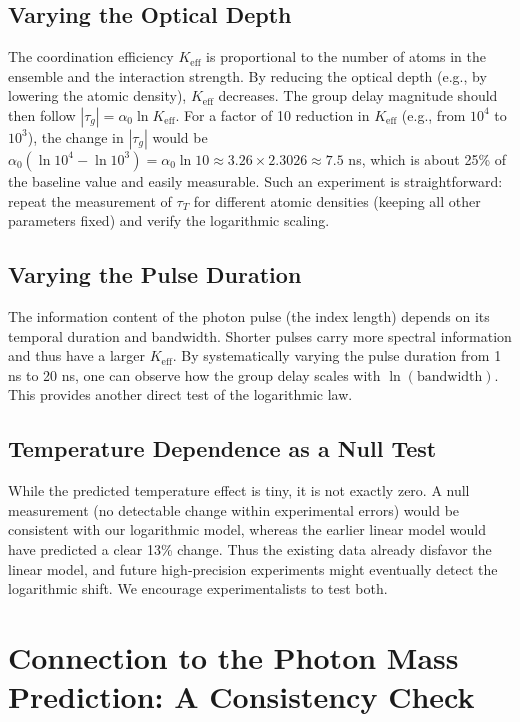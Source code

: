 \documentclass[12pt,a4paper]{article}
\newcommand{\Keff}{K_{\mathrm{eff}}}
\begin{document}
	\subsection{Varying the Optical Depth}
	
	The coordination efficiency \(\Keff\) is proportional to the number of atoms in the ensemble and the interaction strength. By reducing the optical depth (e.g., by lowering the atomic density), \(\Keff\) decreases. The group delay magnitude should then follow \(|\tau_g| = \alpha_0 \ln\Keff\). For a factor of 10 reduction in \(\Keff\) (e.g., from \(10^4\) to \(10^3\)), the change in \(|\tau_g|\) would be \(\alpha_0 (\ln 10^4 - \ln 10^3) = \alpha_0 \ln 10 \approx 3.26 \times 2.3026 \approx 7.5\) ns, which is about 25\% of the baseline value and easily measurable. Such an experiment is straightforward: repeat the measurement of \(\tau_T\) for different atomic densities (keeping all other parameters fixed) and verify the logarithmic scaling.
	
	\subsection{Varying the Pulse Duration}
	
	The information content of the photon pulse (the index length) depends on its temporal duration and bandwidth. Shorter pulses carry more spectral information and thus have a larger \(\Keff\). By systematically varying the pulse duration from 1 ns to 20 ns, one can observe how the group delay scales with \(\ln(\text{bandwidth})\). This provides another direct test of the logarithmic law.
	
	\subsection{Temperature Dependence as a Null Test}
	
	While the predicted temperature effect is tiny, it is not exactly zero. A null measurement (no detectable change within experimental errors) would be consistent with our logarithmic model, whereas the earlier linear model would have predicted a clear 13\% change. Thus the existing data already disfavor the linear model, and future high‑precision experiments might eventually detect the logarithmic shift. We encourage experimentalists to test both.
	

\section{Connection to the Photon Mass Prediction: A Consistency Check}
\label{sec:photon_mass_consistency}
\end{document}

